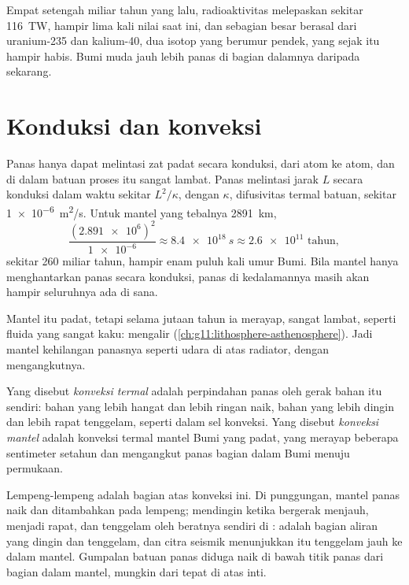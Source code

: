 Empat setengah miliar tahun yang lalu, radioaktivitas melepaskan sekitar
\qty{116}{TW}, hampir lima kali nilai saat ini, dan sebagian besar berasal dari
uranium-235 dan kalium-40, dua isotop yang berumur pendek, yang sejak itu
hampir habis. Bumi muda jauh lebih panas di bagian dalamnya daripada sekarang.

\section{Konduksi dan konveksi}

Panas hanya dapat melintasi zat padat secara konduksi, dari atom ke atom, dan
di dalam batuan proses itu sangat lambat. Panas melintasi jarak $L$ secara
konduksi dalam waktu sekitar $L^2/\kappa$, dengan $\kappa$, difusivitas termal
batuan, sekitar \qty{1e-6}{m^2/s}. Untuk mantel yang tebalnya
\qty{2891}{km},
\[
  \frac{(\num{2.891e6})^2}{\num{1e-6}} \approx \qty{8.4e18}{s} \approx
  \num{2.6e11} \text{ tahun},
\]
sekitar 260 miliar tahun, hampir enam puluh kali umur Bumi. Bila mantel hanya
menghantarkan panas secara konduksi, panas di kedalamannya masih akan hampir
seluruhnya ada di sana.

Mantel itu padat, tetapi selama jutaan tahun ia merayap, sangat lambat, seperti
fluida yang sangat kaku:  mengalir (\cref{ch:g11:lithosphere-asthenosphere}).
Jadi mantel kehilangan panasnya seperti udara di atas radiator, dengan
mengangkutnya.

\begin{definition}\label{def:g12:internal-heat:convection}
Yang disebut \emph{konveksi termal} adalah perpindahan
panas oleh gerak bahan itu sendiri: bahan yang lebih hangat dan lebih ringan
naik, bahan yang lebih dingin dan lebih rapat tenggelam, seperti dalam sel
konveksi. Yang disebut \emph{konveksi mantel} adalah
konveksi termal mantel Bumi yang padat, yang merayap beberapa sentimeter
setahun dan mengangkut panas bagian dalam Bumi menuju permukaan.
\end{definition}

Lempeng-lempeng adalah bagian atas konveksi ini. Di punggungan, mantel panas
naik dan ditambahkan pada lempeng;  mendingin ketika bergerak menjauh,
menjadi rapat, dan tenggelam oleh beratnya sendiri di :
 adalah bagian aliran yang dingin dan tenggelam, dan citra
seismik menunjukkan  itu tenggelam jauh ke dalam mantel.
Gumpalan batuan panas diduga naik di bawah titik panas dari bagian dalam
mantel, mungkin dari tepat di atas inti.

